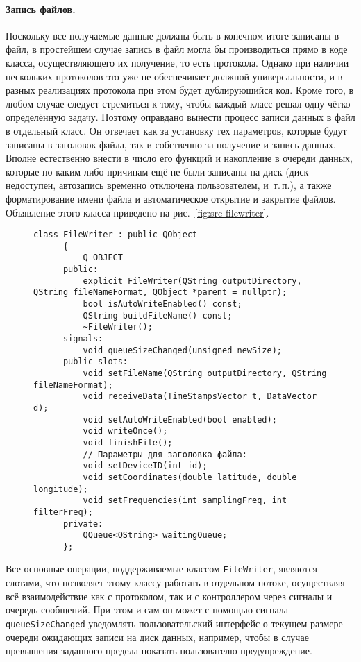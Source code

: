 \documentclass[a4paper, 14pt, titlepage]{extarticle}
\newcommand{\inlinecode}[1]{\lstinline[basicstyle=\ttfamily]{#1}}
\newenvironment{myfigure}[2]%
    {\pushQED{\caption{#1} \label{#2}} %
     \begin{figure}[!htb]\centering } %
    {  \popQED %
     \end{figure}}
\begin{document}
  \paragraph{Запись файлов.}
  Поскольку все получаемые данные должны быть в конечном итоге записаны в файл, в простейшем случае
  запись в файл могла бы производиться прямо в коде класса, осуществляющего их получение, то есть
  протокола. Однако при наличии нескольких протоколов это уже не обеспечивает должной
  универсальности, и в разных реализациях протокола при этом будет дублирующийся код. Кроме того, в
  любом случае следует стремиться к тому, чтобы каждый класс решал одну чётко определённую задачу.
  Поэтому оправдано вынести процесс записи данных в файл в отдельный класс.
  Он отвечает как за установку тех параметров, которые будут записаны в заголовок файла, так и
  собственно за получение и запись данных. Вполне естественно внести в число его функций и
  накопление в очереди данных, которые по каким-либо причинам ещё не были записаны на диск (диск
  недоступен, автозапись временно отключена пользователем, и~т.\,п.), а также форматирование имени
  файла и автоматическое открытие и закрытие файлов. Объявление этого класса приведено на
  рис.~\ref{fig:src-filewriter}.

  \begin{myfigure}{Класс, отвечающий за запись файлов}{fig:src-filewriter}
    \begin{lstlisting}[xleftmargin=7mm, xrightmargin=7mm]
      class FileWriter : public QObject
      {
          Q_OBJECT
      public:
          explicit FileWriter(QString outputDirectory, QString fileNameFormat, QObject *parent = nullptr);
          bool isAutoWriteEnabled() const;
          QString buildFileName() const;
          ~FileWriter();
      signals:
          void queueSizeChanged(unsigned newSize);
      public slots:
          void setFileName(QString outputDirectory, QString fileNameFormat);
          void receiveData(TimeStampsVector t, DataVector d);
          void setAutoWriteEnabled(bool enabled);
          void writeOnce();
          void finishFile();
          // Параметры для заголовка файла:
          void setDeviceID(int id);
          void setCoordinates(double latitude, double longitude);
          void setFrequencies(int samplingFreq, int filterFreq);
      private:
          QQueue<QString> waitingQueue;
      };
    \end{lstlisting}
  \end{myfigure}

  Все основные операции, поддерживаемые классом \inlinecode{FileWriter}, являются слотами, что
  позволяет этому классу работать в отдельном потоке, осуществляя всё взаимодействие как с
  протоколом, так и с контроллером через сигналы и очередь сообщений. При этом и сам он может с
  помощью сигнала \inlinecode{queueSizeChanged} уведомлять пользовательский интерфейс о текущем размере очереди ожидающих записи
  на диск данных, например, чтобы в случае превышения заданного предела показать пользователю предупреждение.
\end{document}
